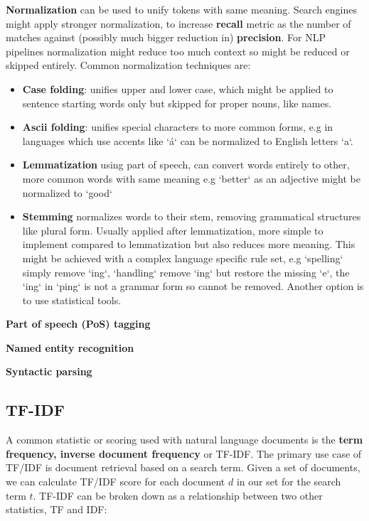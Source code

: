 \textbf{Normalization} can be used to unify tokens with same meaning. Search engines might apply stronger normalization, to increase \textbf{recall} metric as the number of matches against (possibly much bigger reduction in) \textbf{precision}. For NLP pipelines normalization might reduce too much context so might be reduced or skipped entirely. Common normalization techniques are:
\begin{itemize}
    \item \textbf{Case folding}: unifies upper and lower case, which might be applied to sentence starting words only but skipped for proper nouns, like names.
    \item \textbf{Ascii folding}: unifies special characters to more common forms, e.g in languages which use accents like `á` can be normalized to English letters `a`.
    \item \textbf{Lemmatization} using part of speech, can convert words entirely to other, more common words with same meaning e.g `better` as an adjective might be normalized to `good`
    \item \textbf{Stemming} normalizes words to their stem, removing grammatical structures like plural form. Usually applied after lemmatization, more simple to implement compared to lemmatization but also reduces more meaning. This might be achieved with a complex language specific rule set, e.g `spelling` simply remove `ing`, `handling` remove `ing` but restore the missing `e`, the `ing` in `ping` is not a grammar form so cannot be removed. Another option is to use statistical tools.
\end{itemize}

\textbf{Part of speech (PoS) tagging}

\textbf{Named entity recognition}

\textbf{Syntactic parsing}



\subsection{TF-IDF}

A common statistic or scoring used with natural language documents is the \textbf{term frequency, inverse document frequency} or TF-IDF. The primary use case of TF/IDF is document retrieval based on a search term. Given a set of documents, we can calculate TF/IDF score for each document \(d\) in our set for the search term \(t\). TF-IDF can be broken down as a relationship between two other statistics, TF and IDF:

